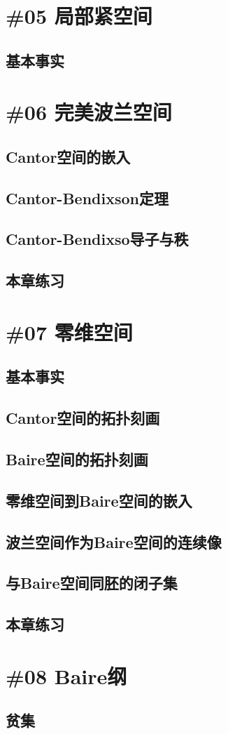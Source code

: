 \section{\#05 局部紧空间}
\subsection{基本事实}
\newpage

\section{\#06 完美波兰空间}
\subsection{Cantor空间的嵌入}
\newpage
\subsection{Cantor-Bendixson定理}
\newpage
\subsection{Cantor-Bendixso导子与秩}
\newpage
\subsection{本章练习}
\newpage

\section{\#07 零维空间}
\subsection{基本事实}
\newpage
\subsection{Cantor空间的拓扑刻画}
\newpage
\subsection{Baire空间的拓扑刻画}
\newpage
\subsection{零维空间到Baire空间的嵌入}
\newpage
\subsection{波兰空间作为Baire空间的连续像}
\newpage
\subsection{与Baire空间同胚的闭子集}
\newpage
\subsection{本章练习}
\newpage

\section{\#08 Baire纲}
\subsection{贫集}
\newpage
